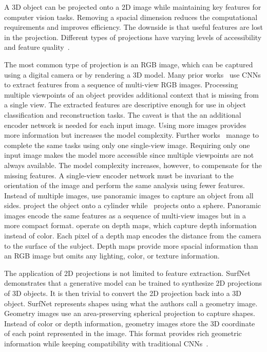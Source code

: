 A 3D object can be projected onto a 2D image while maintaining key features for computer vision tasks. Removing a spacial dimension reduces the computational requirements and improves efficiency. The downside is that useful features are lost in the projection. Different types of projections have varying levels of accessibility and feature quality~\cite{Ahmed2018}.

The most common type of projection is an RGB image, which can be captured using a digital camera or by rendering a 3D model. Many prior works~\cite{Zhu2014, Su2015, Choy2016, Smith2018} use CNNs to extract features from a sequence of multi-view RGB images. Processing multiple viewpoints of an object provides additional context that is missing from a single view. The extracted features are descriptive enough for use in object classification and reconstruction tasks. The caveat is that the an additional encoder network is needed for each input image. Using more images provides more information but increases the model complexity. Further works~\cite{Fan2017, Wang2018, Niu2018, Genova2020, Pan2019} manage to complete the same tasks using only one single-view image. Requiring only one input image makes the model more accessible since multiple viewpoints are not always available. The model complexity increases, however, to compensate for the missing features. A single-view encoder network must be invariant to the orientation of the image and perform the same analysis using fewer features. Instead of multiple images, \cite{Shi2015, Sfikas2017, Cao2017} use panoramic images to capture an object from all sides. \cite{Shi2015, Sfikas2017} project the object onto a cylinder while~\cite{Cao2017} projects onto a sphere. Panoramic images encode the same features as a sequence of multi-view images but in a more compact format. \cite{Zhu2014, Shi2015, Sfikas2017, Cao2017, Genova2020} operate on depth maps, which capture depth information instead of color. Each pixel of a depth map encodes the distance from the camera to the surface of the subject. Depth maps provide more spacial information than an RGB image but omits any lighting, color, or texture information.

The application of 2D projections is not limited to feature extraction. SurfNet~\cite{Sinha2017} demonstrates that a generative model can be trained to synthesize 2D projections of 3D objects. It is then trivial to convert the 2D projection back into a 3D object. SurfNet represents shapes using what the authors call a geometry image. Geometry images use an area-preserving spherical projection to capture shapes. Instead of color or depth information, geometry images store the 3D coordinate of each point represented in the image. This format provides rich geometric information while keeping compatibility with traditional CNNs~\cite{Sinha2017}.

